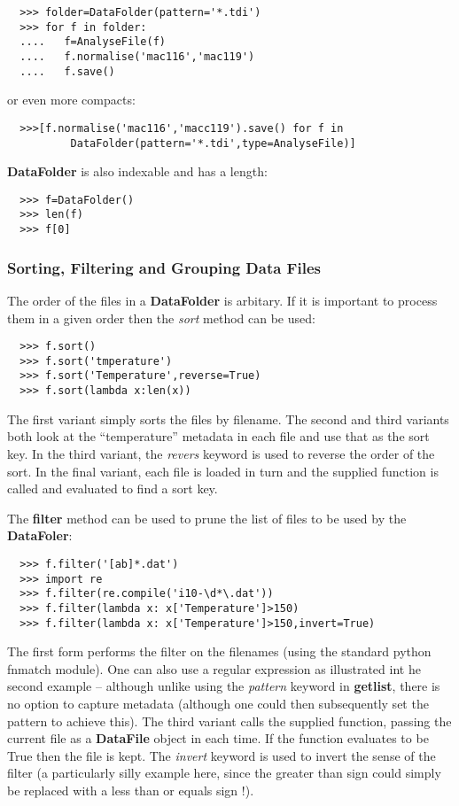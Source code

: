 \documentclass[a4paper,11pt]{scrartcl}
\begin{document}
\begin{verbatim}
  >>> folder=DataFolder(pattern='*.tdi')
  >>> for f in folder:
  ....   f=AnalyseFile(f)
  ....   f.normalise('mac116','mac119')
  ....   f.save()
\end{verbatim}

or even more compacts:

\begin{verbatim}
  >>>[f.normalise('mac116','macc119').save() for f in
          DataFolder(pattern='*.tdi',type=AnalyseFile)]
\end{verbatim}

\textbf{DataFolder} is also indexable and has a length:

\begin{verbatim}
  >>> f=DataFolder()
  >>> len(f)
  >>> f[0]
\end{verbatim}

\subsubsection{Sorting, Filtering and Grouping Data Files}

The order of the files in a \textbf{DataFolder} is arbitary. If it is important to process them in a given order then the \textit{sort} method can be used:

\begin{verbatim}
  >>> f.sort()
  >>> f.sort('tmperature')
  >>> f.sort('Temperature',reverse=True)
  >>> f.sort(lambda x:len(x))
\end{verbatim}

The first variant simply sorts the files by filename. The second and third variants both look at the ``temperature'' metadata in each file and use that as the sort key. In the third variant, the \textit{revers} keyword is used to reverse the order of the sort. In the final variant, each file is loaded in turn and the supplied function is called and evaluated to find a sort key.

The \textbf{filter} method can be used to prune the list of files to be used by the \textbf{DataFoler}:

\begin{verbatim}
  >>> f.filter('[ab]*.dat')
  >>> import re
  >>> f.filter(re.compile('i10-\d*\.dat'))
  >>> f.filter(lambda x: x['Temperature']>150)
  >>> f.filter(lambda x: x['Temperature']>150,invert=True)
\end{verbatim}

The first form performs the filter on the filenames (using the standard python fnmatch module). One can also use a regular expression as illustrated int he second example -- although unlike using the \textit{pattern} keyword in \textbf{getlist}, there is no option to capture metadata (although one could then subsequently set the pattern to achieve this). The third variant calls the supplied function, passing the current file as a \textbf{DataFile} object in each time. If the function evaluates to be True then the file is kept. The \textit{invert} keyword is used to invert the sense of the filter (a particularly silly example here, since the greater than sign could simply be replaced with a less than or equals sign !).
\end{document}
